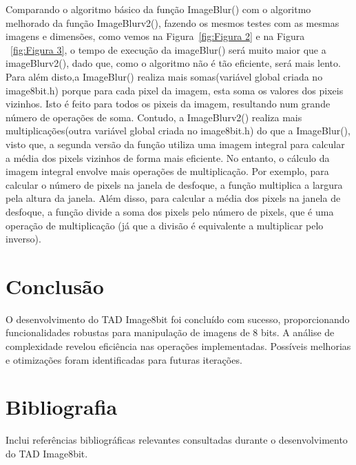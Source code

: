 \documentclass{article}
\begin{document}
Comparando o algoritmo básico da função ImageBlur() com o algoritmo melhorado da função ImageBlurv2(),
fazendo os mesmos testes com as mesmas imagens e dimensões, como vemos na Figura~\ref{fig:Figura 2} e na Figura ~\ref{fig:Figura 3}, 
o tempo de execução da imageBlur() será muito maior que a imageBlurv2(), dado que, como o algoritmo não é tão eficiente,
será mais lento. Para além disto,a ImageBlur() realiza mais somas(variável global criada no image8bit.h) porque para cada pixel da imagem, 
esta soma os valores dos pixeis vizinhos. Isto é feito para todos os pixeis da imagem, resultando
num grande número de operações de soma. Contudo, a ImageBlurv2() realiza mais multiplicações(outra variável global criada no image8bit.h)
do que a ImageBlur(), visto que, a segunda versão da função utiliza uma imagem integral para calcular
a média dos pixels vizinhos de forma mais eficiente. No entanto, o cálculo da imagem integral envolve
mais operações de multiplicação. Por exemplo, para calcular o número de pixels na janela de desfoque,
a função multiplica a largura pela altura da janela. Além disso, para calcular a média dos pixels na
janela de desfoque, a função divide a soma dos pixels pelo número de pixels, que é uma operação de 
multiplicação (já que a divisão é equivalente a multiplicar pelo inverso).

































\section{Conclusão}

O desenvolvimento do TAD Image8bit foi concluído com sucesso, proporcionando funcionalidades robustas para manipulação de imagens de 8 bits. A análise de complexidade revelou eficiência nas operações implementadas. Possíveis melhorias e otimizações foram identificadas para futuras iterações.

\section{Bibliografia}

Inclui referências bibliográficas relevantes consultadas durante o desenvolvimento do TAD Image8bit.
\end{document}
